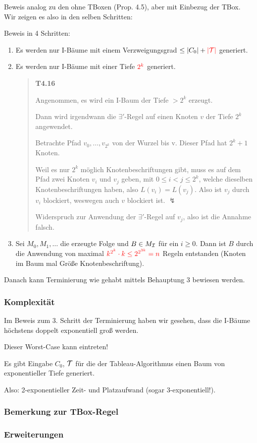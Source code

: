 Beweis analog zu den ohne TBoxen (Prop. 4.5), aber mit Einbezug der TBox. Wir zeigen es also in den selben Schritten:

Beweis in 4 Schritten:

\begin{enumerate}
\def\labelenumi{\arabic{enumi}.}
\item
  Es werden nur I-Bäume mit einem Verzweigungsgrad $\leq \left| C_{0} \right| + \color{red} \left| \mathcal{T} \right|$ generiert.
\item
  Es werden nur I-Bäume mit einer Tiefe $\color{red} 2^k$ generiert.
  \begin{quote}
  \textbf{T4.16}

  Angenommen, es wird ein I-Baum der Tiefe $> 2^k$ erzeugt.

  Dann wird irgendwann die $\exists '$-Regel auf einen Knoten $v$ der Tiefe $2^k$ angewendet.

  Betrachte Pfad $v_0, \ldots , v_{2^k}$ von der Wurzel bis v. Dieser Pfad hat $2^k+1$ Knoten.

  Weil es nur $2^k$ möglich Knotenbeschriftungen gibt, muss es auf dem Pfad zwei Knoten $v_i$ und $v_j$ geben, mit $0 \leq i < j \leq 2^k$, welche dieselben Knotenbeschriftungen haben, also $L(v_i) = L(v_j)$. Also ist $v_j$ durch $v_i$ blockiert, weswegen auch $v$ blockiert ist. $\lightning$

  Widerspruch zur Anwendung der $\exists '$-Regel auf $v_j$, also ist die Annahme falsch.
  \end{quote}
\item
  Sei $M_{0},M_{1},\ldots$ die erzeugte Folge und $B \in M_{\mathcal{I}}$ für
  ein $i \geq 0$. Dann ist $B$ durch die Anwendung von maximal
  $\color{red} k^{2^{k}} \cdot k \leq 2^{2^{3k}}= n$ Regeln entstanden (Knoten im Baum mal Größe Knotenbeschriftung).
\end{enumerate}

Danach kann Terminierung wie gehabt mittels Behauptung 3 bewiesen werden.

\subsubsection{Komplexität}

Im Beweis zum 3. Schritt der Terminierung haben wir gesehen, dass die I-Bäume höchstens doppelt exponentiell groß werden.

Dieser Worst-Case kann eintreten!

\begin{lemma}
Es gibt Eingabe $C_0$, $\mathcal{T}$ für die der Tableau-Algorithmus einen Baum von exponentieller Tiefe generiert.
\end{lemma}

Also: 2-exponentieller Zeit- und Platzaufwand (sogar 3-exponentiell!).

\subsubsection{Bemerkung zur TBox-Regel}

\subsubsection{Erweiterungen}